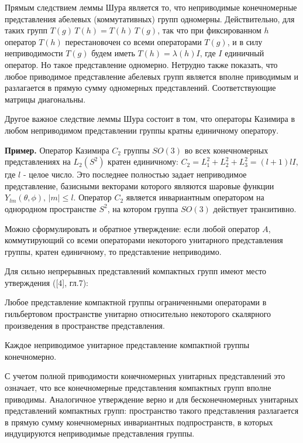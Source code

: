 \documentclass[a4paper
]{article}
\begin{document}
\noindent Прямым следствием леммы Шура является то, что
неприводимые конечномерные представления абелевых (коммутативных)
групп одномерны. Действительно, для таких групп
$T(g)\,T(h)=T(h)\,T(g)$, так что при фиксированном  $h$ оператор
$T(h)$   перестановочен со всеми операторами  $T(g)$, и  в силу
неприводимости $T(g)$ будем иметь  $T(h)=\lambda(h) I$, где  $I$
единичный оператор. Но такое представление одномерно. Нетрудно
также показать, что любое приводимое представление абелевых групп
является вполне приводимым и разлагается в прямую сумму одномерных
представлений. Соответствующие матрицы диагональны.
\par
Другое важное следствие леммы Шура состоит в том, что операторы
Казимира в любом неприводимом представлении группы  кратны
единичному оператору.
\par
{\bf Пример.} Оператор Казимира $C_2$ группы $SO(3)$ во всех
конечномерных представлениях на $L_2(S^2)$ кратен единичному:
$C_2=L_1^2+L_2^2+L_3^2=(l+1)l I $, где  $l$ - целое число. Это
последнее полностью задает неприводимое представление, базисными
векторами которого являются шаровые функции
$Y_{lm}(\theta,\phi),\, |m|\leq l$. Оператор $C_2$ является
инвариантным оператором на однородном пространстве $S^2$, на
котором группа $SO(3)$ действует транзитивно.
\par
Можно сформулировать и обратное утверждение: если любой оператор
$A$, коммутирующий со всеми операторами некоторого унитарного
представления группы, кратен единичному, то представление
неприводимо.
\par
Для сильно непрерывных представлений компактных групп имеют место
утверждения ([4], гл.7):\begin{Trm}Любое представление компактной
группы ограниченными операторами в гильбертовом пространстве
унитарно относительно некоторого скалярного произведения в
пространстве представления.\end{Trm}\begin{Trm}Каждое неприводимое
унитарное представление компактной группы конечномерно.
\end{Trm}\noindent С учетом полной приводимости конечномерных
унитарных представлений это означает, что все конечномерные
представления компактных групп вполне приводимы. Аналогичное
утверждение верно и для бесконечномерных унитарных представлений
компактных групп: пространство такого представления разлагается в
прямую сумму конечномерных инвариантных подпространств, в которых
индуцируются неприводимые представления группы.
\par
\end{document}
